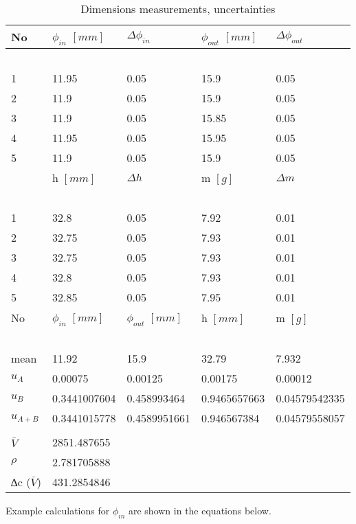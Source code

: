 \begin{table}[!ht]
    \centering
    \begin{tabular}{|l|l|l|l|l|}
    \hline
       No & $\phi_{in}$ $[mm]$&$\Delta{\phi_{in}}$ & $\phi_{out}$ $[mm]$& $\Delta{\phi_{out}}$ \\ \hline
         ~ & ~ & ~ & ~ & ~ \\ \hline
        1 & 11.95 & 0.05 & 15.9 & 0.05 \\ \hline
        2 & 11.9 & 0.05 & 15.9 & 0.05 \\ \hline
        3 & 11.9 & 0.05 & 15.85 & 0.05 \\ \hline
        4 & 11.95 & 0.05 & 15.95 & 0.05 \\ \hline
        5 & 11.9 & 0.05 & 15.9 & 0.05 \\ \hline
        
        ~ & h $[mm]$& $\Delta{h}$ & m $[g]$ & $\Delta{m}$  \\ 
        ~ & ~ & ~ & ~ & ~ \\ \hline
        1 & 32.8 & 0.05 & 7.92 & 0.01 \\ \hline
        2 & 32.75 & 0.05 & 7.93 & 0.01 \\ \hline
        3 & 32.75 & 0.05 & 7.93 & 0.01 \\ \hline
        4 & 32.8 & 0.05 & 7.93 & 0.01 \\ \hline
        5 & 32.85 & 0.05 & 7.95 & 0.01 \\ \hline

        No  & $\phi_{in}$ $[mm]$& $\phi_{out}$ $[mm]$& h $[mm]$& m  $[g]$\\ 
        ~ & ~ & ~ & ~ & ~ \\ \hline
        mean & 11.92 & 15.9 & 32.79 & 7.932 \\ \hline
        $u_A$ & 0.00075 & 0.00125 & 0.00175 & 0.00012 \\ \hline
        $u_B$ & 0.3441007604 & 0.458993464 & 0.9465657663 & 0.04579542335 \\ \hline
        $u_{A+B}$ & 0.3441015778 & 0.4589951661 & 0.946567384 & 0.04579558057 \\ \hline
        \multicolumn{5}{c}{}\\ \hline
        $\bar{V}$ & 2851.487655 & ~ & ~ & ~ \\ \hline
        $\rho$ & 2.781705888 & ~ & ~ & ~ \\ \hline
        ∆c ($\bar{V}$) & 431.2854846& ~ & ~ & ~  \\ \hline
        
    \end{tabular}
    \caption{Dimensions measurements, uncertainties}
\label{tab:calliper}
\end{table}
Example calculations for $\phi_{in}$ are shown in the equations below.

